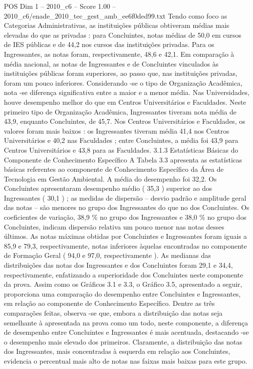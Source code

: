 \begin{textsample}{POS Dim 1 – 2010\_c6 – Score 1.00 – 2010\_c6/enade\_2010\_tec\_gest\_amb\_ee6f0ded99.txt}
Tendo como foco as Categorias Administrativas, as instituições públicas obtiveram médias mais elevadas do que as privadas : para Concluintes, notas médias de 50,0 em cursos de IES públicas e de 44,2 nos cursos das instituições privadas.
Para os Ingressantes, as notas foram, respectivamente, 48,6 e 42,1.
Em comparação à média nacional, as notas de Ingressantes e de Concluintes vinculados às instituições públicas foram superiores, ao passo que, nas instituições privadas, foram um pouco inferiores.
Considerando -se o tipo de Organização Acadêmica, nota -se diferença significativa entre a maior e a menor média.
Nas Universidades, houve desempenho melhor do que em Centros Universitários e Faculdades.
Neste primeiro tipo de Organização Acadêmica, Ingressantes tiveram nota média de 43,9, enquanto Concluintes, de 45,7.
Nos Centros Universitários e Faculdades, os valores foram mais baixos : os Ingressantes tiveram média 41,4 nos Centros Universitários e 40,2 nas Faculdades ; entre Concluintes, a média foi 43,9 para Centros Universitários e 43,8 para as Faculdades. 3.1.3 Estatísticas Básicas do Componente de Conhecimento Específico A Tabela 3.3 apresenta as estatísticas básicas referentes ao componente de Conhecimento Específico da Área de Tecnologia em Gestão Ambiental.
A média do desempenho foi 32,2.
Os Concluintes apresentaram desempenho médio ( 35,3 ) superior ao dos Ingressantes ( 30,1 ) ; as medidas de dispersão – desvio padrão e amplitude geral das notas – são menores no grupo dos Ingressantes do que no dos Concluintes.
Os coeficientes de variação, 38,9 \% no grupo dos Ingressantes e 38,0 \% no grupo dos Concluintes, indicam dispersão relativa um pouco menor nas notas desses últimos.
As notas máximas obtidas por Concluintes e Ingressantes foram iguais a 85,9 e 79,3, respectivamente, notas inferiores àquelas encontradas no componente de Formação Geral ( 94,0 e 97,0, respectivamente ).
As medianas das distribuições das notas dos Ingressantes e dos Concluintes foram 29,1 e 34,4, respectivamente, enfatizando a superioridade dos Concluintes neste componente da prova.
Assim como os Gráficos 3.1 e 3.3, o Gráfico 3.5, apresentado a seguir, proporciona uma comparação do desempenho entre Concluintes e Ingressantes, em relação ao componente de Conhecimento Específico.
Dentre as três comparações feitas, observa -se que, embora a distribuição das notas seja semelhante à apresentada na prova como um todo, neste componente, a diferença de desempenho entre Concluintes e Ingressantes é mais acentuada, destacando -se o desempenho mais elevado dos primeiros.
Claramente, a distribuição das notas dos Ingressantes, mais concentradas à esquerda em relação aos Concluintes, evidencia o percentual mais alto de notas nas faixas mais baixas para este grupo.

\end{textsample}
